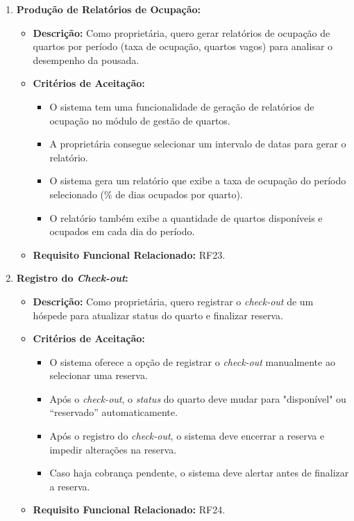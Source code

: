 \documentclass[
	12pt,				%
	openany,			%
	twoside,			%
	a4paper,			%
	english,			%
	french,				%
	spanish,			%
	brazil				%
	]{abntex2}
\begin{document}
\begin{enumerate}[label=\textbf{\arabic*.}]
\begin{itemize}
	 \end{itemize} 
	  \item \textbf{Produção de Relatórios de Ocupação:}
	 \begin{itemize}
	 	\item \textbf{Descrição:} Como proprietária, quero gerar relatórios de ocupação de quartos por período (taxa de ocupação, quartos vagos) para analisar o desempenho da pousada.
	 	\item \textbf{Critérios de Aceitação:}
	 	\begin{itemize}
	 		\item O sistema tem uma funcionalidade de geração de relatórios de ocupação no módulo de gestão de quartos.
	 		\item A proprietária consegue selecionar um intervalo de datas para gerar o relatório.
	 		\item O sistema gera um relatório que exibe a taxa de ocupação do período selecionado (\% de dias ocupados por quarto).
	 		\item O relatório também exibe a quantidade de quartos disponíveis e ocupados em cada dia do período.
	 	\end{itemize}
	 	\item \textbf{Requisito Funcional Relacionado:} RF23.
	 \end{itemize} 
	  \item \textbf{Registro do \textit{Check-out}:}
	 \begin{itemize}
	 	\item \textbf{Descrição:}  Como proprietária, quero registrar o \textit{check-out} de um hóspede para atualizar status do quarto e finalizar reserva.
	 	\item \textbf{Critérios de Aceitação:}
	 	\begin{itemize}
	 		\item O sistema oferece a opção de registrar o \textit{check-out} manualmente ao selecionar uma reserva.
	 		\item Após o \textit{check-out}, o \textit{status} do quarto deve mudar para "disponível" ou “reservado” automaticamente.
	 		\item Após o registro do \textit{check-out}, o sistema deve encerrar a reserva e impedir alterações na reserva.
	 		\item Caso haja cobrança pendente, o sistema deve alertar antes de finalizar a reserva.
	 	\end{itemize}
	 	\item \textbf{Requisito Funcional Relacionado:} RF24.

\end{itemize}
\end{enumerate}
\end{document}

